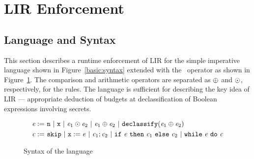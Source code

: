 \section{LIR Enforcement}
\label{sec:formalization}

\subsection{Language and Syntax}
This section describes a runtime enforcement of LIR for the simple
imperative language shown in Figure~\ref{basic:syntax} extended with
the \dec~operator as shown in Figure~\ref{fig:syntaxLIR}. The
comparison and arithmetic operators are separated as $\oplus$ and $\odot$,
respectively, for the rules. The language
is sufficient for describing the key idea of LIR --- appropriate
deduction of budgets at declassification of Boolean expressions involving
secrets. 

\begin{figure}[!htbp]
\begin{align*}
  \mathit{e}	:=~&\texttt{n}~\arrowvert~\texttt{x}~\arrowvert~\mathit{e}_1 \odot \mathit{e}_2~\arrowvert~
             \mathit{e}_1 \oplus \mathit{e}_2~\arrowvert~\texttt{declassify}(\mathit{e}_1 \oplus \mathit{e}_2)\\
  \mathit{c}	:=~&\texttt{skip}~\arrowvert~\texttt{x} :=
             \mathit{e}~\arrowvert~\mathit{c}_1;\mathit{c}_2~\arrowvert~\texttt{if}~\mathit{e}~\texttt{then}~\mathit{c}_1~\texttt{else}~\mathit{c}_2~\arrowvert~ 
   \texttt{while}~\mathit{e}~\texttt{do}~\mathit{c}
\end{align*}
\caption{Syntax of the language}
\label{fig:syntaxLIR}
\end{figure}

